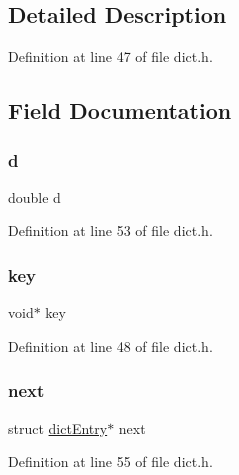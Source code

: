 \subsection{Detailed Description}


Definition at line 47 of file dict.\+h.



\subsection{Field Documentation}
\mbox{\label{structdict_entry_a873684cefeb665f3d5e6b495de57fc0d}} 
\subsubsection{\texorpdfstring{d}{d}}
{\footnotesize\ttfamily double d}



Definition at line 53 of file dict.\+h.

\mbox{\label{structdict_entry_ab5c000aec752f2206131e183daf5efbf}} 
\subsubsection{\texorpdfstring{key}{key}}
{\footnotesize\ttfamily void$\ast$ key}



Definition at line 48 of file dict.\+h.

\mbox{\label{structdict_entry_ac1e00303554dcf7f08f4a1a4eb81f398}} 
\subsubsection{\texorpdfstring{next}{next}}
{\footnotesize\ttfamily struct \hyperlink{structdict_entry}{dict\+Entry}$\ast$ next}



Definition at line 55 of file dict.\+h.

\mbox{\label{structdict_entry_ae66ed2ec20c2115ff9970c73168fc0df}} 
